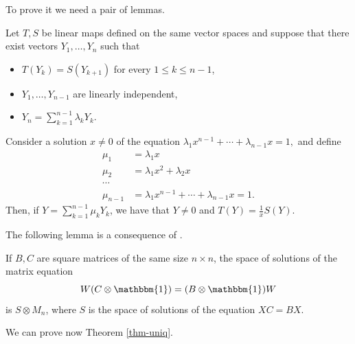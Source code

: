 \documentclass[aps,prl,epsfig,graphics,floatfix,mathbbm,a4paper]{article}
\newcommand{\1}{\mathbbm{1}}
\renewcommand{\>}{\rangle}
\newcommand{\<}{\langle}
\begin{document}
To prove it we need a pair of lemmas.




\begin{lemma}\label{lem-same-matr}
    Let $T,S$ be linear maps defined on the same vector spaces and
    suppose that there exist vectors $Y_1,\ldots,Y_n$ such that
    \begin{itemize}
        \item $T(Y_k)=S(Y_{k+1})$ for every $1\le k\le n-1$, \item
              $Y_1,\ldots,Y_{n-1}$ are linearly independent, \item
              $Y_n=\sum_{k=1}^{n-1}\lambda_k Y_k$.
    \end{itemize}
    Consider a solution $x\neq 0$ of the equation $\lambda_1 x^{n-1}
        +\cdots + \lambda_{n-1}x=1,$  and  define
    \begin{align*}
        \mu_1     & =\lambda_1x                                    \\
        \mu_2     & =\lambda_1x^2+\lambda_2x                       \\
        \cdots                                                     \\
        \mu_{n-1} & =\lambda_1 x^{n-1} +\cdots + \lambda_{n-1}x=1.
    \end{align*}
    Then, if $Y=\sum_{k=1}^{n-1}\mu_k Y_k$, we have that $Y\not =0$
    and  $T(Y)=\frac{1}{x}S(Y)$.
\end{lemma}


The following lemma is a consequence of \cite[Theorem
    4.4.14]{HornJohnson91}.
\begin{lemma}\label{lem-horn}
    If $B,C$ are square matrices of the same size $n\times n$, the
    space of solutions of the matrix equation $$W(C\otimes
        \mathbbm{1})=(B\otimes \mathbbm{1})W$$ is $S\otimes M_n$, where
    $S$ is the space of solutions of the equation $XC=BX$.
\end{lemma}
We can prove now Theorem \ref{thm-uniq}.
\end{document}
